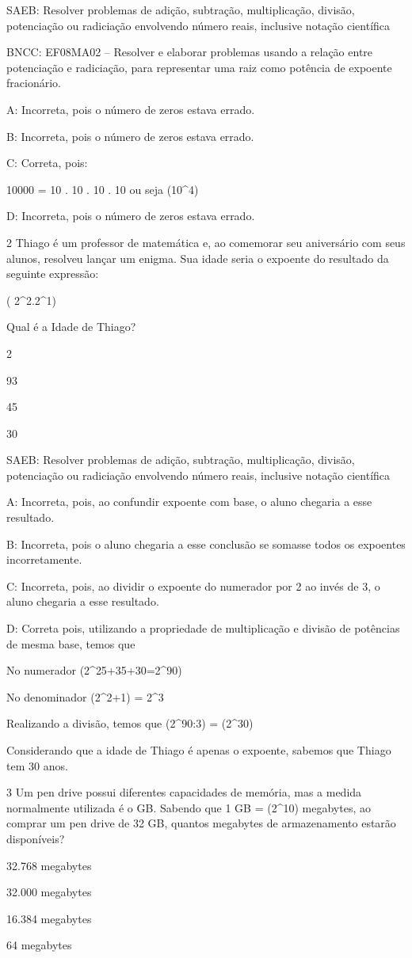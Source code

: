 SAEB: Resolver problemas de adição, subtração, multiplicação, divisão,
potenciação ou radiciação envolvendo número reais, inclusive notação
científica

BNCC: EF08MA02 -- Resolver e elaborar problemas usando a relação entre
potenciação e radiciação, para representar uma raiz como potência de
expoente fracionário.

A: Incorreta, pois o número de zeros estava errado.

B: Incorreta, pois o número de zeros estava errado.

C: Correta, pois:

10000 = 10 . 10 . 10 . 10 ou seja (10^4)

D: Incorreta, pois o número de zeros estava errado.

\num{2} Thiago é um professor de matemática e, ao comemorar seu aniversário
com seus alunos, resolveu lançar um enigma. Sua idade seria o expoente
do resultado da seguinte expressão:

( {2^2.2^1})

Qual é a Idade de Thiago?
\item 2
\item 93
\item 45
\item 30

SAEB: Resolver problemas de adição, subtração, multiplicação, divisão,
potenciação ou radiciação envolvendo número reais, inclusive notação
científica

A: Incorreta, pois, ao confundir expoente com base, o aluno chegaria a
esse resultado.

B: Incorreta, pois o aluno chegaria a esse conclusão se somasse todos os
expoentes incorretamente.

C: Incorreta, pois, ao dividir o expoente do numerador por 2 ao invés de
3, o aluno chegaria a esse resultado.

D: Correta pois, utilizando a propriedade de multiplicação e divisão de
potências de mesma base, temos que

No numerador (2^{25+35+30}=2^{90})

No denominador (2^{2+1}) = 2^3

Realizando a divisão, temos que (2^{90}:3) = (2^{30})

Considerando que a idade de Thiago é apenas o expoente, sabemos que
Thiago tem 30 anos.

\num{3} Um pen drive possui diferentes capacidades de memória, mas a medida
normalmente utilizada é o GB. Sabendo que 1 GB = (2^{10}) megabytes,
ao comprar um pen drive de 32 GB, quantos megabytes de armazenamento
estarão disponíveis?
\item 32.768 megabytes
\item 32.000 megabytes
\item 16.384 megabytes
\item 64 megabytes

